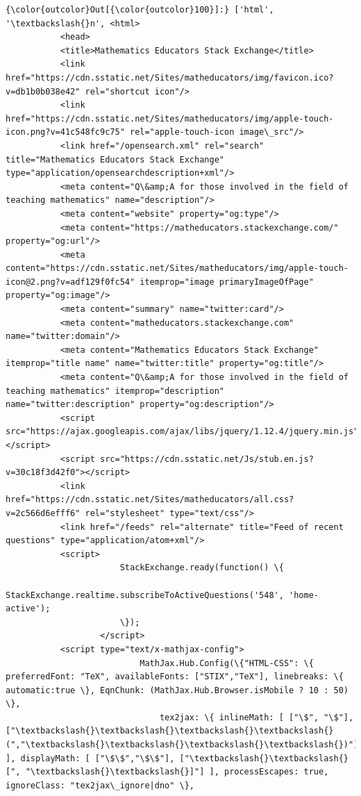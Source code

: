 \documentclass[11pt]{article}
\begin{document}
\begin{Verbatim}[commandchars=\\\{\}]
{\color{outcolor}Out[{\color{outcolor}100}]:} ['html', '\textbackslash{}n', <html>
           <head>
           <title>Mathematics Educators Stack Exchange</title>
           <link href="https://cdn.sstatic.net/Sites/matheducators/img/favicon.ico?v=db1b0b038e42" rel="shortcut icon"/>
           <link href="https://cdn.sstatic.net/Sites/matheducators/img/apple-touch-icon.png?v=41c548fc9c75" rel="apple-touch-icon image\_src"/>
           <link href="/opensearch.xml" rel="search" title="Mathematics Educators Stack Exchange" type="application/opensearchdescription+xml"/>
           <meta content="Q\&amp;A for those involved in the field of teaching mathematics" name="description"/>
           <meta content="website" property="og:type"/>
           <meta content="https://matheducators.stackexchange.com/" property="og:url"/>
           <meta content="https://cdn.sstatic.net/Sites/matheducators/img/apple-touch-icon@2.png?v=adf129f0fc54" itemprop="image primaryImageOfPage" property="og:image"/>
           <meta content="summary" name="twitter:card"/>
           <meta content="matheducators.stackexchange.com" name="twitter:domain"/>
           <meta content="Mathematics Educators Stack Exchange" itemprop="title name" name="twitter:title" property="og:title"/>
           <meta content="Q\&amp;A for those involved in the field of teaching mathematics" itemprop="description" name="twitter:description" property="og:description"/>
           <script src="https://ajax.googleapis.com/ajax/libs/jquery/1.12.4/jquery.min.js"></script>
           <script src="https://cdn.sstatic.net/Js/stub.en.js?v=30c18f3d42f0"></script>
           <link href="https://cdn.sstatic.net/Sites/matheducators/all.css?v=2c566d6efff6" rel="stylesheet" type="text/css"/>
           <link href="/feeds" rel="alternate" title="Feed of recent questions" type="application/atom+xml"/>
           <script>
                       StackExchange.ready(function() \{
                           StackExchange.realtime.subscribeToActiveQuestions('548', 'home-active');
                       \});
                   </script>
           <script type="text/x-mathjax-config">
                           MathJax.Hub.Config(\{"HTML-CSS": \{ preferredFont: "TeX", availableFonts: ["STIX","TeX"], linebreaks: \{ automatic:true \}, EqnChunk: (MathJax.Hub.Browser.isMobile ? 10 : 50) \},
                               tex2jax: \{ inlineMath: [ ["\$", "\$"], ["\textbackslash{}\textbackslash{}\textbackslash{}\textbackslash{}(","\textbackslash{}\textbackslash{}\textbackslash{}\textbackslash{})"] ], displayMath: [ ["\$\$","\$\$"], ["\textbackslash{}\textbackslash{}[", "\textbackslash{}\textbackslash{}]"] ], processEscapes: true, ignoreClass: "tex2jax\_ignore|dno" \},

\end{Verbatim}
\end{document}
